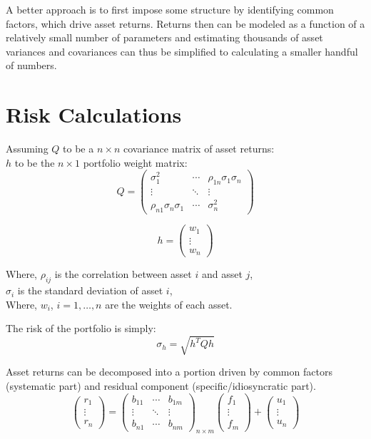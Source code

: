 \documentclass{article}
\begin{document}
A better approach is to first impose some structure by identifying common factors, which drive asset returns. Returns then can be modeled as a function of a relatively small number of parameters and estimating thousands of asset variances and covariances can thus be simplified to calculating a smaller handful of numbers.

\section*{Risk Calculations}
Assuming \( Q \) to be a \( n \times n \) covariance matrix of asset returns: \\
\( h \) to be the \( n \times 1 \) portfolio weight matrix:
\begin{equation}
Q = \begin{pmatrix}
\sigma_1^2 & \cdots & \rho_{1n}\sigma_1\sigma_n \\
\vdots & \ddots & \vdots \\
\rho_{n1}\sigma_n\sigma_1 & \cdots & \sigma_n^2
\end{pmatrix}
\end{equation}

\begin{equation}
h = \begin{pmatrix}
w_1 \\
\vdots \\
w_n
\end{pmatrix}
\end{equation}

Where, \( \rho_{ij} \) is the correlation between asset \( i \) and asset \( j \), \\
\( \sigma_i \) is the standard deviation of asset \( i \), \\
Where, \( w_i \), \( i = 1, \ldots, n \) are the weights of each asset.

The risk of the portfolio is simply:
\begin{equation}
    \sigma_h = \sqrt{h^T Q h}
\end{equation}

Asset returns can be decomposed into a portion driven by common factors (systematic part) and residual component (specific/idiosyncratic part).
\begin{equation}
\begin{pmatrix}
r_1 \\
\vdots \\
r_n
\end{pmatrix}
=
\begin{pmatrix}
b_{11} & \cdots & b_{1m} \\
\vdots & \ddots & \vdots \\
b_{n1} & \cdots & b_{nm}
\end{pmatrix}_{n \times m}
\begin{pmatrix}
f_1 \\
\vdots \\
f_m
\end{pmatrix}
+
\begin{pmatrix}
u_1 \\
\vdots \\
u_n
\end{pmatrix}
\end{equation}
\end{document}
